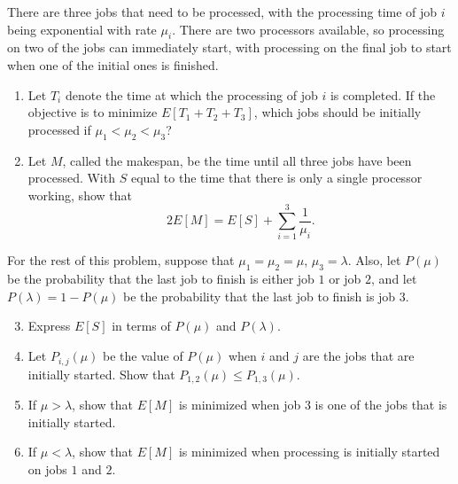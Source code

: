 \begin{exercise}
\label{ex:counting-processes-16}
There are three jobs that need to be processed, with the processing time of job $i$ being exponential with rate $\mu_i$. There are two processors available, so processing on two of the jobs can immediately start, with processing on the final job to start when one of the initial ones is finished.
\begin{enumerate}
\item Let $T_i$ denote the time at which the processing of job $i$ is completed. If the objective is to minimize $E[T_1+T_2+T_3]$, which jobs should be initially processed if $\mu_1<\mu_2<\mu_3$?
\item Let $M$, called the makespan, be the time until all three jobs have been processed. With $S$ equal to the time that there is only a single processor working, show that
\[
2E[M]=E[S]+\sum_{i=1}^3\frac1{\mu_i}.
\]
\end{enumerate}
For the rest of this problem, suppose that $\mu_1=\mu_2=\mu$, $\mu_3=\lambda$. Also, let $P(\mu)$ be the probability that the last job to finish is either job $1$ or job $2$, and let $P(\lambda)=1-P(\mu)$ be the probability that the last job to finish is job $3$.
\begin{enumerate}
\setcounter{enumi}{2}
\item Express $E[S]$ in terms of $P(\mu)$ and $P(\lambda)$.
\item Let $P_{i,j}(\mu)$ be the value of $P(\mu)$ when $i$ and $j$ are the jobs that are initially started. Show that $P_{1,2}(\mu)\le P_{1,3}(\mu)$.
\item If $\mu>\lambda$, show that $E[M]$ is minimized when job $3$ is one of the jobs that is initially started.
\item If $\mu<\lambda$, show that $E[M]$ is minimized when processing is initially started on jobs $1$ and $2$.
\end{enumerate}
\end{exercise}

